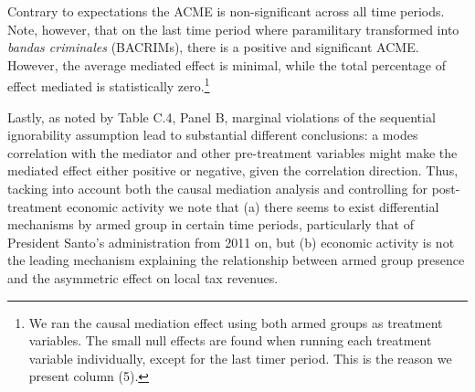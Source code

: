 Contrary to expectations the ACME is non-significant across all time periods. Note, however, that on the last time period where paramilitary transformed into \emph{bandas criminales} (BACRIMs), there is a positive and significant ACME. However, the average mediated effect is minimal, while the total percentage of effect mediated is statistically zero.\footnote{We ran the causal mediation effect using both armed groups as treatment variables. The small null effects are found when running each treatment variable individually, except for the last timer period. This is the reason we present column (5).}  

Lastly, as noted by Table C.4, Panel B, marginal violations of the sequential ignorability assumption lead to substantial different conclusions: a modes correlation with the mediator and other pre-treatment variables might make the mediated effect either positive or negative, given the correlation direction. Thus, tacking into account both the causal mediation analysis and controlling for post-treatment economic activity we note that (a) there seems to exist differential mechanisms by armed group in certain time periods, particularly that of President Santo's administration from 2011 on, but (b) economic activity is not the leading mechanism explaining the relationship between armed group presence and the asymmetric effect on local tax revenues. 

